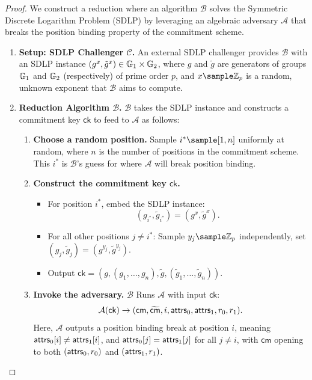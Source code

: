 \begin{proof}
We construct a reduction where an algorithm $\mathcal{B}$ solves the Symmetric Discrete Logarithm Problem (SDLP) by leveraging an algebraic adversary $\mathcal{A}$ that breaks the position binding property of the commitment scheme.

\begin{enumerate}
    \item \textbf{Setup: SDLP Challenger $\mathcal{C}$.} An external SDLP challenger provides $\mathcal{B}$ with an SDLP instance $(g^x, \tilde{g}^x) \in \mathbb{G}_1 \times \mathbb{G}_2$, where $g$ and $\tilde{g}$ are generators of groups $\mathbb{G}_1$ and $\mathbb{G}_2$ (respectively) of prime order $p$, and $x \sample \Z_p$ is a random, unknown exponent that $\mathcal{B}$ aims to compute.

    \item \textbf{Reduction Algorithm $\mathcal{B}$.} $\mathcal{B}$ takes the SDLP instance and constructs a commitment key $\mathsf{ck}$ to feed to $\mathcal{A}$ as follows:

        \begin{enumerate}
        \item \textbf{Choose a random position.} Sample $i^* \sample [1, n]$ uniformly at random, where $n$ is the number of positions in the commitment scheme. This $i^*$ is $\mathcal{B}$'s guess for where $\mathcal{A}$ will break position binding.
        
        \item \textbf{Construct the commitment key $\mathsf{ck}$.}
        \begin{itemize}
            \item For position $i^*$, embed the SDLP instance: 
            $$(g_{i^*}, \tilde{g}_{i^*}) = (g^x, \tilde{g}^x).$$
            \item For all other positions $j \neq i^*$: Sample $y_j \sample \Z_p$ independently, set $(g_j, \tilde{g}_j) = (g^{y_j}, \tilde{g}^{y_j})$.
            \item Output $\mathsf{ck} = (g, (g_1, \ldots, g_n), \tilde{g}, (\tilde{g}_1, \ldots, \tilde{g}_n))$.
        \end{itemize}
        
        \item \textbf{Invoke the adversary.} $\mathcal{B}$ Runs $\mathcal{A}$ with input $\mathsf{ck}$: 
        $$\mathcal{A}(\mathsf{ck}) \rightarrow (\mathsf{cm}, \widetilde{\mathsf{cm}}, i, \mathsf{attrs}_0, \mathsf{attrs}_1, r_0, r_1).$$
        Here, $\mathcal{A}$ outputs a position binding break at position $i$, meaning $\mathsf{attrs}_0[i] \neq \mathsf{attrs}_1[i]$, and $\mathsf{attrs}_0[j] = \mathsf{attrs}_1[j]$ for all $j \neq i$, with $\mathsf{cm}$ opening to both $(\mathsf{attrs}_0, r_0)$ and $(\mathsf{attrs}_1, r_1)$.
    \end{enumerate}


\end{enumerate}
\end{proof}
